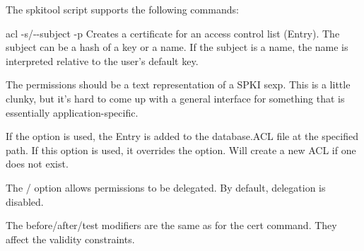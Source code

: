 \documentclass{howto}
\begin{document}
The spkitool script supports the following commands:

\begin{datadescni}{acl -s/-{}-subject  -p 
	   
	}
    Creates a certificate for an access control list (Entry).  The
    subject can be a hash of a key or a name.  If the subject is a
    name, the name is interpreted relative to the user's default key.

    The permissions should be a text representation of a SPKI sexp.
    This is a little clunky, but it's hard to come up with a general
    interface for something that is essentially application-specific.

    If the \programopt{-} option is used, the Entry is
    added to the database.ACL file at the specified path.  If this
    option is used, it overrides the  option.  Will
    create a new ACL if one does not exist.

    The /\programopt{-} option allows
    permissions to be delegated.  By default, delegation is disabled.

    The before/after/test modifiers are the same as for the cert
    command.  They affect the validity constraints.
\end{datadescni}
 
\end{document}
